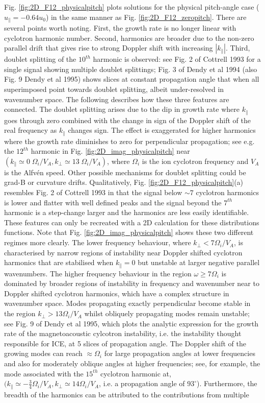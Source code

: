 \documentclass[12pt]{iopart}
\begin{document}
Fig. \ref{fig:2D_F12_physicalpitch} plots solutions for the physical pitch-angle case ($u_\parallel = -0.64 u_0$) in the same manner as Fig. \ref{fig:2D_F12_zeropitch}. There are several points worth noting. First, the growth rate is no longer linear with cyclotron harmonic number. Second, harmonics are broader due to the non-zero parallel drift that gives rise to strong Doppler shift with increasing $|k_\parallel|$. Third, doublet splitting of the $10^{th}$ harmonic is observed: see Fig. 2 of Cottrell 1993 for a single signal showing multiple doublet splittings; Fig. 3 of Dendy et al 1994 (also Fig. 9 Dendy et al 1995) shows slices at constant propagation angle that when all superimposed point towards doublet splitting, albeit under-resolved in wavenumber space. The following describes how these three features are connected. The doublet splitting arises due to the dip in growth rate where $k_\parallel$ goes through zero combined with the change in sign of the Doppler shift of the real frequency as $k_\parallel$ changes sign. The effect is exaggerated for higher harmonics where the growth rate diminishes to zero for perpendicular propagation; see e.g. the $12^{th}$ harmonic in Fig. \ref{fig:2D_imag_physicalpitch} near $(k_\parallel \simeq 0\; \Omega_{i}/V_A, k_\bot \simeq 13\; \Omega_{i}/V_A)$, where $\Omega_{i}$ is the ion cyclotron frequency and $V_A$ is the Alfv{\'e}n speed. Other possible mechanisms for doublet splitting could be grad-B or curvature drifts\cite{Cottrell1993}. Qualitatively, Fig. \ref{fig:2D_F12_physicalpitch}(a) resembles Fig. 2 of Cottrell 1993 in that the signal below $\sim 7$ cyclotron harmonics is lower and flatter with well defined peaks and the signal beyond the $7^{th}$ harmonic is a step-change larger and the harmonics are less easily identifiable. These features can only be recreated with a 2D calculation for these distributions functions. Note that Fig. \ref{fig:2D_imag_physicalpitch} shows these two different regimes more clearly. The lower frequency behaviour, where $k_\perp < 7 \Omega_i/V_A$, is characterised by narrow regions of instability near Doppler shifted cyclotron harmonics that are stabilised when $k_\parallel=0$ but unstable at larger negative parallel wavenumbers. The higher frequency behaviour in the region $\omega\geq 7\Omega_i$ is dominated by broader regions of instability in frequency and wavenumber near to Doppler shifted cyclotron harmonics, which have a complex structure in wavenumber space. Modes propagating exactly perpendicular become stable in the region $k_\perp > 13 \Omega_i/V_A$ whilst obliquely propagating modes remain unstable; see Fig. 9 of Dendy et al 1995, which plots the analytic expression for the growth rate of the magnetoacoustic cylcotron instability, i.e. the instability thought responsible for ICE, at 5 slices of propagation angle. The Doppler shift of the growing modes can reach $\approx \Omega_i$ for large propagation angles at lower frequencies and also for moderately oblique angles at higher frequencies; see, for example, the mode associated with the $15^{th}$ cyclotron harmonic at, $(k_\parallel \simeq -\frac{3}{4} \Omega_i/V_A, k_\perp \simeq 14 \Omega_i/V_A$, i.e. a propagation angle of $93^\circ$). Furthermore, the breadth of the harmonics can be attributed to the contributions from multiple 
\end{document}
